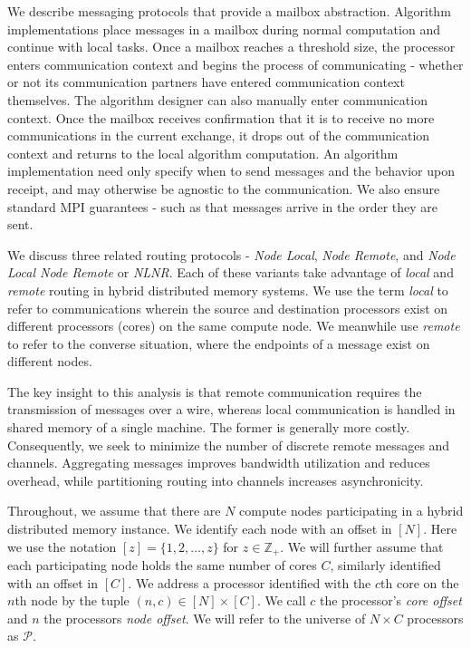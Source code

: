 \documentclass{report}
\begin{document}
We describe messaging protocols that provide a mailbox abstraction.
Algorithm implementations place messages in a mailbox during normal computation and continue with local tasks. 
Once a mailbox reaches a threshold size, the processor enters communication context and begins the process of communicating - whether or not its communication partners have entered communication context themselves. 
The algorithm designer can also manually enter communication context.
Once the mailbox receives confirmation that it is to receive no more communications in the current exchange, it drops out of the communication context and returns to the local algorithm computation.
An algorithm implementation need only specify when to send messages and the behavior upon receipt, and may otherwise be agnostic to the communication.
We also ensure standard MPI guarantees - such as that messages arrive in the order they are sent. 

We discuss three related routing protocols - \emph{Node Local}, \emph{Node Remote}, and \emph{Node Local Node Remote} or \emph{NLNR}.
Each of these variants take advantage of \emph{local} and \emph{remote} routing in hybrid distributed memory systems. 
We use the term \emph{local} to refer to communications wherein the source and destination processors exist on different processors (cores) on the same compute node.
We meanwhile use \emph{remote} to refer to the converse situation, where the endpoints of a message exist on different nodes. 

The key insight to this analysis is that remote communication requires the transmission of messages over a wire, whereas local communication is handled in shared memory of a single machine. 
The former is generally more costly.
Consequently, we seek to minimize the number of discrete remote messages and channels.
Aggregating messages improves bandwidth utilization and reduces overhead, while  partitioning routing into channels increases asynchronicity. 

Throughout, we assume that there are $N$ compute nodes participating in a hybrid distributed memory instance.
We identify each node with an offset in $[N]$.
Here we use the notation $[z] = \{1, 2, \dots, z\}$ for $z \in \mathbb{Z}_+$.
We will further assume that each participating node holds the same number of cores $C$, similarly identified with an offset in $[C]$. 
We address a processor identified with the $c$th core on the $n$th node by the tuple $(n,c) \in [N] \times [C]$.
We call $c$ the processor's \emph{core offset} and $n$ the processors \emph{node offset}.
We will refer to the universe of $N \times C$ processors as $\mathcal{P}$.
\end{document}
